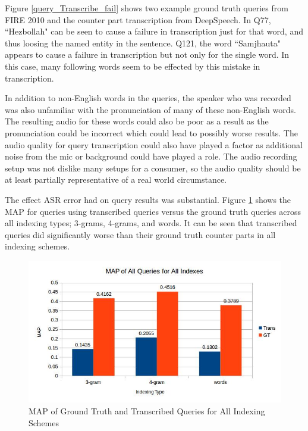 \documentclass[jair, twoside,11pt,theapa]{article}
\begin{document}
Figure \ref{query_Transcribe_fail} shows two example ground truth queries from FIRE 2010 and the counter part transcription from DeepSpeech. In Q77, ``Hezbollah" can be seen to cause a failure in transcription just for that word, and thus loosing the named entity in the sentence. Q121, the word ``Samjhauta" appears to cause a failure in transcription but not only for the single word. In this case, many following words seem to be effected by this mistake in transcription. 

In addition to non-English words in the queries, the speaker who was recorded was also unfamiliar with the pronunciation of many of these non-English words. The resulting audio for these words could also be poor as a result as the pronunciation could be incorrect which could lead to possibly worse results. The audio quality for query transcription could also have played a factor as additional noise from the mic or background could have played a role. The audio recording setup was not dislike many setups for a consumer, so the audio quality should be at least partially representative of a real world circumstance.  

The effect ASR error had on query results was substantial. Figure \ref{fig:MAP_all} shows the MAP for queries using transcribed queries versus the ground truth queries across all indexing types; 3-grams, 4-grams, and words. It can be seen that transcribed queries did significantly worse than their ground truth counter parts in all indexing schemes.


\begin{figure}[h!]
\centering
\includegraphics[width=1.0\linewidth]{../ResultImages/MAP}
\vspace{-3em}
\caption{MAP of Ground Truth and Transcribed Queries for All Indexing Schemes}
\label{fig:MAP_all}
\end{figure}
\end{document}
